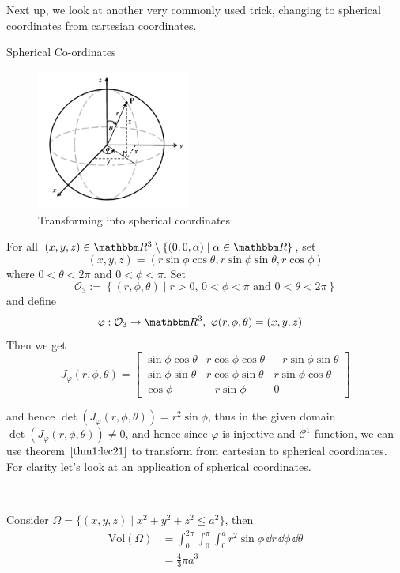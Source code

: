 \documentclass[Analysis-3]{subfiles}
\begin{document}
Next up, we look at another very commonly used trick, changing to spherical coordinates from cartesian coordinates. 

\begin{Eg}{Spherical Co-ordinates}{}
    \begin{figure}
        \centering
        \includegraphics[width=0.45\textwidth]{figures/lec21.2.png}
        \caption{Transforming into spherical coordinates}
        \label{fig2:21}
    \end{figure}
    For all $(x,y,z) \in \R^3 \setminus \{ (0,0,\alpha) \mid \alpha \in \R \}$, set 
    \[
        (x,y,z) = (r\sin\phi\cos\theta, r\sin\phi\sin\theta, r \cos\phi)    
    \]
    where $0 < \theta < 2\pi$ and $0 < \phi < \pi$. Set 
    \[
        \mathcal{O}_3 := \left\{ (r,\phi,\theta) \mid r >0, \, 0 < \phi < \pi \mbox{ and } 0 < \theta < 2\pi \right\}    
    \]
    and define 
    \begin{align*}
        \varphi : \mathcal{O}_3 &\to \R^3, \ \varphi(r,\phi,\theta) = (x,y,z)  
    \end{align*}
    Then we get 
    \[
        J_{\varphi}(r,\phi,\theta) = \begin{bmatrix}
            \sin\phi\cos\theta & r\cos\phi\cos\theta & -r\sin\phi\sin\theta \\ 
            \sin\phi\sin\theta & r\cos\phi\sin\theta & r\sin\phi\cos\theta \\ 
            \cos\phi & -r\sin\phi & 0
        \end{bmatrix}    
    \]


    and hence $\det(J_{\varphi}(r,\phi,\theta)) = r^2 \sin \phi$, thus in the given domain $\det(J_{\varphi}(r,\phi,\theta)) \neq 0$, and hence since $\varphi$ is injective and $\mathscr{C}^1$ function, we can use theorem $\ref{thm1:lec21}$ to transform from cartesian to spherical coordinates. For clarity let's look at an application of spherical coordinates. 

    \

    Consider $\Omega = \{ (x,y,z) \mid x^2 + y^2 + z^2 \leq a^2 \}$, then 
    \begin{align*}
        \mathrm{Vol}(\Omega) &= \int_0^{2\pi}\int_0^{\pi} \int_0^a r^2 \sin \phi \, \dd r \, \dd \phi \, \dd \theta \\ 
        &= \frac{4}{3}\pi a^3
    \end{align*}
\end{Eg}
\end{document}
